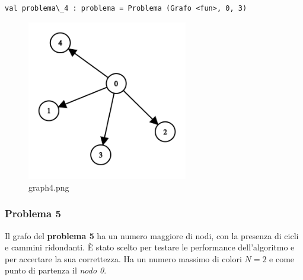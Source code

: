 \documentclass[11pt]{article}
\makeatletter
\newcommand{\boxspacing}{\kern\kvtcb@left@rule\kern\kvtcb@boxsep}
\newcommand{\prompt}[4]{
        {\ttfamily\llap{{\color{#2}[#3]:\hspace{3pt}#4}}\vspace{-\baselineskip}}
    }
\makeatother
\begin{document}
            \begin{tcolorbox}[breakable, size=fbox, boxrule=.5pt, pad at break*=1mm, opacityfill=0]
\prompt{Out}{outcolor}{7}{\boxspacing}
\begin{Verbatim}[commandchars=\\\{\}]
val problema\_4 : problema = Problema (Grafo <fun>, 0, 3)

\end{Verbatim}
\end{tcolorbox}
        
    \begin{figure}
\centering
\includegraphics[width=7cm, keepaspectratio]{Colored Camel_files/graph4.png}
\caption{graph4.png}
\end{figure}

    \hypertarget{problema-5}{%
\subsubsection{\texorpdfstring{Problema 5
}{Problema 5 }}\label{problema-5}}

    Il grafo del \textbf{problema 5} ha un numero maggiore di nodi, con la
presenza di cicli e cammini ridondanti. È stato scelto per testare le
performance dell'algoritmo e per accertare la sua correttezza. Ha un
numero massimo di colori \(N = 2\) e come punto di partenza il
\emph{nodo 0}.
\end{document}
